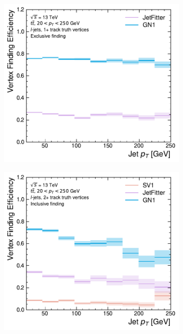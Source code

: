 \begin{figure}[!htbp]
    \centering
    \begin{subfigure}[b]{0.48\textwidth}
        \centering
        \includegraphics[width=\textwidth]{chapters/gnn_tagger/figs/results/tracks/ttbar/ttbar_ljet_vert_eff_1+_track_excl.pdf}
    \end{subfigure}
    \quad
    \begin{subfigure}[b]{0.48\textwidth}
        \centering
        \includegraphics[width=\textwidth]{chapters/gnn_tagger/figs/results/tracks/ttbar/ttbar_ljet_vert_eff_2+_track_incl.pdf}

\end{subfigure}
\end{figure}
